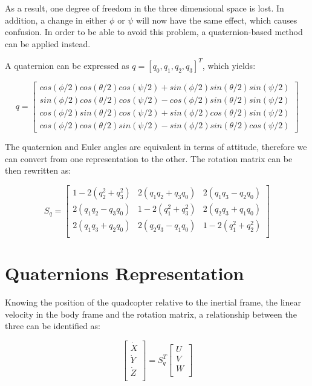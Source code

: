 As a result, one degree of freedom in the three dimensional space is lost. In addition, a change in either $\phi$ or $\psi$ will now have the same effect, which causes confusion. In order to be able to avoid this problem, a quaternion-based method can be applied instead. 

A quaternion can be expressed as $q=[q_{0}, q_{1}, q_{2}, q_{3}]^{T}$, which yields:

\begin{equation}
\label{S4}
 q=\begin{bmatrix}
 	cos(\phi/2) cos(\theta/2) cos(\psi/2) + sin(\phi/2) sin(\theta/2) sin(\psi/2) \\
 	sin(\phi/2) cos(\theta/2) cos(\psi/2) - cos(\phi/2) sin(\theta/2) sin(\psi/2) \\
 	cos(\phi/2) sin(\theta/2) cos(\psi/2) + sin(\phi/2) cos(\theta/2) sin(\psi/2) \\
 	cos(\phi/2) cos(\theta/2) sin(\psi/2) - sin(\phi/2) sin(\theta/2) cos(\psi/2)
\end{bmatrix}
\end{equation}
 	 
The quaternion and Euler angles are equivalent in terms of attitude, therefore we can convert from one representation to the other. The rotation matrix can be then rewritten as:

\begin{equation}
\label{S5}
 S_{q}=\begin{bmatrix}
 	1-2(q_{2}^{2}+q_{3}^{2}) & 2(q_{1}q_{2}+q_{3}q_{0}) & 2(q_{1}q_{3}-q_{2}q_{0}) \\
 	2(q_{1}q_{2}-q_{3}q_{0}) & 1-2(q_{1}^{2}+q_{3}^{2}) & 2(q_{2}q_{3}+q_{1}q_{0})  \\
 	2(q_{1}q_{3}+q_{2}q_{0}) & 2(q_{2}q_{3}-q_{1}q_{0}) & 1-2(q_{1}^{2}+q_{2}^{2}) \\
\end{bmatrix}
\end{equation}

\section{Quaternions Representation}
Knowing the position of the quadcopter relative to the inertial frame, the linear velocity in the body frame and the rotation matrix, a relationship between the three can be identified as:

\begin{equation}
\label{S6}
 \begin{bmatrix}
 	\dot{X} \\
 	\dot{Y} \\
 	\dot{Z} \\
 	\end{bmatrix}=S_{q}^{T}\begin{bmatrix}
 	U \\
 	V \\
 	W \\
 	\end{bmatrix}
 	 \end{equation}
 	 
